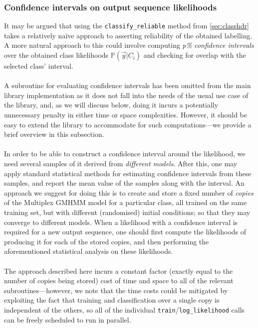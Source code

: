 \documentclass[12pt,openany]{article}
\begin{document}
	\subsubsection{Confidence intervals on output sequence likelihoods}
	It may be argued that using the {\tt classify\_reliable} method from \cref{sec:classhdr} takes a relatively na\"{i}ve approach to asserting reliability of the obtained labelling. A more natural approach to this could involve computing \emph{p\% confidence intervals} over the obtained class likelihoods $\mathbb{P}(\vec{y}|C_i)$ and checking for overlap with the selected class' interval.\\ \\
	A subroutine for evaluating confidence intervals has been omitted from the main library implementation as it does not fall into the needs of the usual use case of the library, and, as we will discuss below, doing it incurs a potentially unnecessary penalty in either time or space complexities. However, it should be easy to extend the library to accommodate for such computations---we provide a brief overview in this subsection.\\ \\
	In order to be able to construct a confidence interval around the likelihood, we need several samples of it derived from \emph{different models}. After this, one may apply standard statistical methods for estimating confidence intervals from these samples, and report the mean value of the samples along with the interval. An approach we suggest for doing this is to create and store a fixed number of \emph{copies} of the Multiplex GMHMM model for a particular class, all trained on the same training set, but with different (randomised) initial conditions; so that they may converge to different models. When a likelihood with a confidence interval is required for a new output sequence, one should first compute the likelihoods of producing it for each of the stored copies, and then performing the aforementioned statistical analysis on these likelihoods.\\ \\
	The approach described here incurs a constant factor (exactly equal to the number of copies being stored) cost of time and space to all of the relevant subroutines---however, we note that the time costs could be mitigated by exploiting the fact that training and classification over a single copy is independent of the others, so all of the individual {\tt train}/{\tt log\_likelihood} calls can be freely scheduled to run in parallel.
\end{document}
